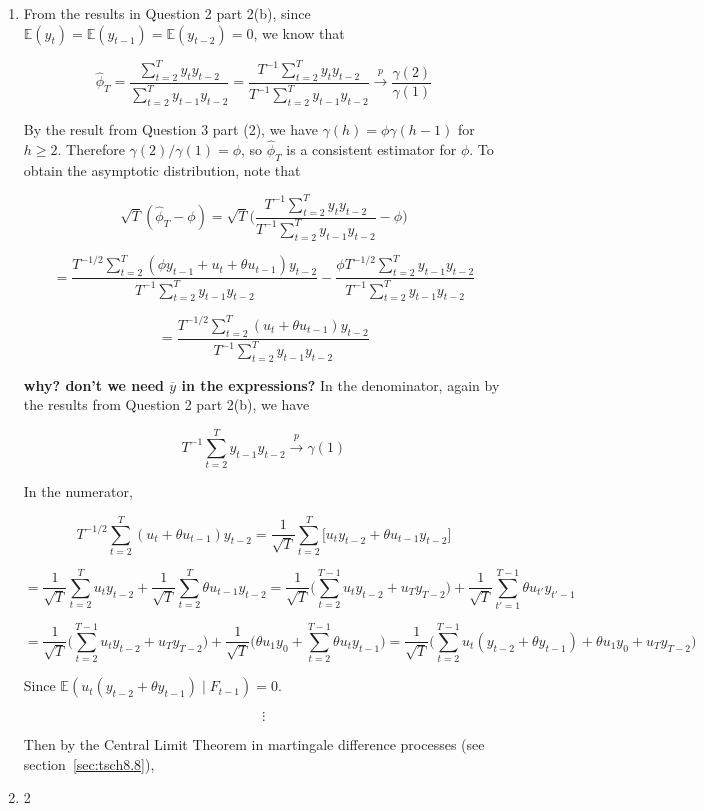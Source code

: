 \documentclass{article}
\newcommand{\E}{\mathbb{E}}
\begin{document}
\begin{enumerate}[(1)]

\item From the results in Question 2 part 2(b), since \(\E(y_t) = \E(y_{t-1}) = \E(y_{t-2}) = 0\), we know that

\[
\hat{\phi}_T = \frac{\sum_{t=2}^T y_t y_{t-2}}{\sum_{t=2}^T y_{t-1} y_{t-2}} = \frac{T^{-1}\sum_{t=2}^T y_t y_{t-2}}{T^{-1}\sum_{t=2}^T y_{t-1} y_{t-2}} \xrightarrow{p} \frac{\gamma(2)}{\gamma(1)} 
\]

By the result from Question 3 part (2), we have \(\gamma(h) = \phi \gamma(h-1)\) for \(h \geq 2\). Therefore \(\gamma(2)/\gamma(1) = \phi\), so \(\hat{\phi}_T\) is a consistent estimator for \(\phi\). To obtain the asymptotic distribution, note that


\[
\sqrt{T}(\hat{\phi}_T - \phi) = \sqrt{T} \bigg(\frac{T^{-1}\sum_{t=2}^T y_t y_{t-2}}{T^{-1}\sum_{t=2}^T y_{t-1} y_{t-2}}  - \phi \bigg) 
\]

\[
= \frac{T^{-1/2}\sum_{t=2}^T (\phi y_{t-1} + u_t + \theta u_{t-1}) y_{t-2}}{T^{-1}\sum_{t=2}^T y_{t-1}y_{t-2}} -  \frac{\phi T^{-1/2}\sum_{t=2}^T y_{t-1} y_{t-2}}{T^{-1}\sum_{t=2}^T y_{t-1} y_{t-2}}
\]

\[
= \frac{T^{-1/2}\sum_{t=2}^T (u_t + \theta u_{t-1}) y_{t-2}}{T^{-1}\sum_{t=2}^T y_{t-1}y_{t-2}} 
\]

\textbf{why? don't we need \(\overline{y}\) in the expressions?} In the denominator, again by the results from Question 2 part 2(b), we have

\[
T^{-1}\sum_{t=2}^T y_{t-1}y_{t-2} \xrightarrow{p} \gamma(1)
\]

In the numerator, 

\[
T^{-1/2}\sum_{t=2}^T (u_t + \theta u_{t-1}) y_{t-2} = \frac{1}{\sqrt{T}}\sum_{t=2}^T \big[u_t y_{t-2} + \theta u_{t-1} y_{t-2} \big] 
\]

\[
= \frac{1}{\sqrt{T}}\sum_{t=2}^T u_t y_{t-2} +  \frac{1}{\sqrt{T}}\sum_{t=2}^T  \theta  u_{t-1} y_{t-2}  = \frac{1}{\sqrt{T}}\bigg(\sum_{t=2}^{T-1} u_t y_{t-2} + u_T y_{T-2} \bigg) +  \frac{1}{\sqrt{T}}\sum_{t'=1}^{T-1}  \theta  u_{t'} y_{t'-1} 
\]

\[
= \frac{1}{\sqrt{T}} \bigg(\sum_{t=2}^{T-1} u_t y_{t-2} + u_T y_{T-2}\bigg)  + \frac{1}{\sqrt{T}} \bigg( \theta u_1 y_0 + \sum_{t=2}^{T-1}  \theta  u_{t} y_{t-1} \bigg)  = \frac{1}{\sqrt{T}} \bigg( \sum_{t=2}^{T-1} u_t(y_{t-2} + \theta y_{t-1}) + \theta u_1 y_0 + u_T y_{T-2} \bigg)
\] 

Since \(\E( u_t(y_{t-2} + \theta y_{t-1}) \mid F_{t-1} ) = 0\).

\[
\vdots
\]

Then by the Central Limit Theorem in martingale difference processes (see section~\ref{sec:tsch8.8}), 

\item 2

\end{enumerate}
\end{document}
